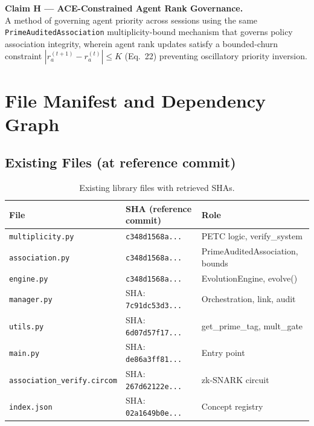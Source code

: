 \documentclass[12pt,letterpaper]{article}
\theoremstyle{definition}
\theoremstyle{remark}
\begin{document}
\begin{claimbox}
\textbf{Claim H — ACE-Constrained Agent Rank Governance.}\\
A method of governing agent priority across sessions using the same
\texttt{PrimeAuditedAssociation} multiplicity-bound mechanism that governs policy
association integrity, wherein agent rank updates satisfy a bounded-churn constraint
\(|r_a^{(t+1)} - r_a^{(t)}| \leq K\) (Eq.\ 22) preventing oscillatory priority
inversion.
\end{claimbox}

\newpage

\section{File Manifest and Dependency Graph}

\subsection{Existing Files (at reference commit)}

\begin{table}[H]
\centering
\small
\begin{tabular}{@{}lll@{}}
\toprule
\textbf{File} & \textbf{SHA (reference commit)} & \textbf{Role} \\
\midrule
\texttt{multiplicity.py}             & \texttt{c348d1568a...} & PETC logic, verify\_system \\
\texttt{association.py}              & \texttt{c348d1568a...} & PrimeAuditedAssociation, bounds \\
\texttt{engine.py}                   & \texttt{c348d1568a...} & EvolutionEngine, evolve() \\
\texttt{manager.py}                  & SHA: \texttt{7c91dc53d3...} & Orchestration, link, audit \\
\texttt{utils.py}                    & SHA: \texttt{6d07d57f17...} & get\_prime\_tag, mult\_gate \\
\texttt{main.py}                     & SHA: \texttt{de86a3ff81...} & Entry point \\
\texttt{association\_verify.circom}  & SHA: \texttt{267d62122e...} & zk-SNARK circuit \\
\texttt{index.json}                  & SHA: \texttt{02a1649b0e...} & Concept registry \\
\bottomrule
\end{tabular}
\caption{Existing library files with retrieved SHAs.}
\end{table}
\end{document}
